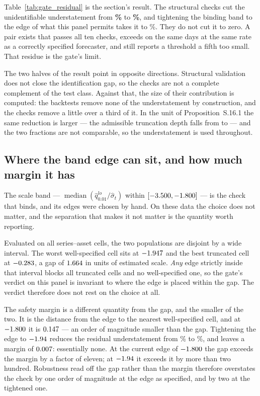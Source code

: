 \documentclass[preprint,11pt,authoryear]{elsarticle}
\newcommand{\1}{\boldsymbol{1}}
\begin{document}
Table~\ref{tab:gate_residual} is the section's result. The structural checks cut
the unidentifiable understatement from \textbf{\nGapUndUni\%} to
\textbf{\nGapUndGateNow\%}, and tightening the binding band to the edge of what
this panel permits takes it to \nTightUnd\%. They do not cut it to zero. A pair exists that passes all ten checks, exceeds on the same
days at the same rate as a correctly specified forecaster, and still reports a
threshold a fifth too small. That residue is the gate's limit.

The two halves of the result point in opposite directions. Structural validation
does not close the identification gap, so the checks are not a complete
complement of the test class. Against that, the size of their contribution is
computed: the backtests remove none of the understatement by construction, and
the checks remove a little over a third of it. In the unit of
Proposition~S.16.1 the same reduction is larger --- the
admissible truncation depth falls from \nGapDeltaUni{} to
\nGapDeltaGateNow{} --- and the two fractions are not comparable, so the
understatement is used throughout.

\subsection{\texorpdfstring{Where the band edge can sit, and how much margin it has}{Where the band edge can sit, and how much margin it has}}
\label{app:gate_band}

The scale band --- $\operatorname{median}(\hat q^{lo}_{0.01}/\hat\sigma_t)$
within $[-3.500, -1.800]$ --- is the check that binds, and its
edges were chosen by hand. On these data the choice does not matter, and the
separation that makes it not matter is the quantity worth reporting.

Evaluated on all \nGapCellsTotal{} series--asset cells, the two populations are
disjoint by a wide interval. The worst well-specified cell sits at
$-1.947$ and the best truncated cell at $-0.283$, a gap
of $1.664$ in units of estimated scale. \emph{Any} edge strictly inside
that interval blocks all \nGapCellsTrunc{} truncated cells and no well-specified
one, so the gate's verdict on this panel is invariant to where the edge is placed
within the gap. The verdict therefore does not rest on the choice at all.

The safety margin is a different quantity from the gap, and the smaller of the
two. It is the distance from the edge to the nearest well-specified cell, and at
$-1.800$ it is $0.147$ --- an order of magnitude smaller than
the gap. Tightening the edge to $-1.94$ reduces the residual understatement from
\nGapUndGateNow\% to \nTightUnd\%, and leaves a margin of $0.007$: essentially none. At the current edge of $-1.800$ the
gap exceeds the margin by a factor of eleven; at $-1.94$ it exceeds it
by more than two hundred. Robustness read off the gap rather than the margin
therefore overstates the check by one order of magnitude at the edge as
specified, and by two at the tightened one.
\end{document}
